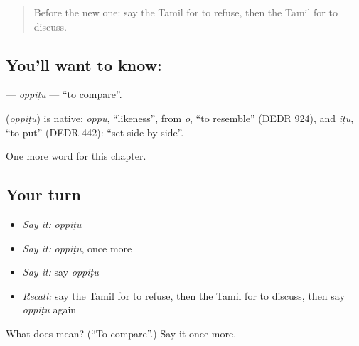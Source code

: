 \label{lesson:TA-C199-oppitu}



\begin{quote}
Before the new one: say the Tamil for to refuse, then the Tamil for to discuss.
\end{quote}

\subsection*{You'll want to know: }
\textbf{} — \emph{oppiṭu} — \textquotedblleft{}to compare\textquotedblright{}.

\begin{cousinweb}
\textbf{} (\emph{oppiṭu}) is native: \emph{oppu}, \textquotedblleft{}likeness\textquotedblright{}, from \emph{o}, \textquotedblleft{}to resemble\textquotedblright{} (DEDR 924), and \emph{iṭu}, \textquotedblleft{}to put\textquotedblright{} (DEDR 442): \textquotedblleft{}set side by side\textquotedblright{}.
\end{cousinweb}

\begin{grammarlens}[title={What you've built}]
One more word for this chapter.
\end{grammarlens}

\subsection*{Your turn}
\begin{itemize}
\raggedright
  \item \emph{Say it:} \emph{oppiṭu}
  \item \emph{Say it:} \emph{oppiṭu}, once more
  \item \emph{Say it:} say \emph{oppiṭu}
  \item \emph{Recall:} say the Tamil for to refuse, then the Tamil for to discuss, then say \emph{oppiṭu} again
\end{itemize}

\begin{tcolorbox}[breakable,colback=teal!4,colframe=teal!35!black,title={Before you move on}]
What does  mean? (\textquotedblleft{}To compare\textquotedblright{}.) Say it once more.
\end{tcolorbox}
